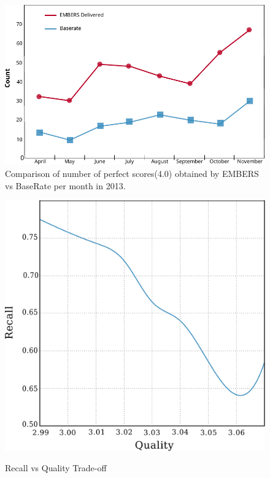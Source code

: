 \begin{figure}
\includegraphics[width=\columnwidth]{figures/cu/perf_figures.pdf}
\caption{Comparison of number of perfect scores(4.0) obtained by EMBERS vs BaseRate per month in 2013.}
\label{fig:perfect_score}
\end{figure}

\begin{figure}
\centering
\includegraphics[width=\columnwidth]{figures/cu/recallVsQS.pdf}
\label{fig:recallvsQS}
\caption{Recall vs Quality Trade-off}
\end{figure}


